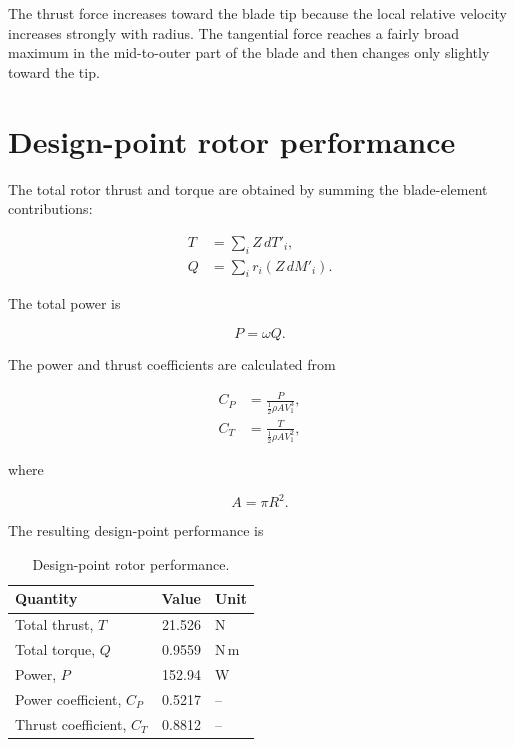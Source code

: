 \documentclass[11pt,a4paper]{article}
\begin{document}
The thrust force increases toward the blade tip because the local relative
velocity increases strongly with radius. The tangential force reaches a
fairly broad maximum in the mid-to-outer part of the blade and then changes
only slightly toward the tip.

\section{Design-point rotor performance}

The total rotor thrust and torque are obtained by summing the blade-element
contributions:

\begin{align}
T &= \sum_i Z\,dT'_i,\\
Q &= \sum_i r_i(Z\,dM'_i).
\end{align}

The total power is

\begin{equation}
P=\omega Q.
\end{equation}

The power and thrust coefficients are calculated from

\begin{align}
C_P &=
\frac{P}
{\frac{1}{2}\rho A V_1^3},\\
C_T &=
\frac{T}
{\frac{1}{2}\rho A V_1^2},
\end{align}

where

\[
A=\pi R^2.
\]

The resulting design-point performance is

\begin{table}[H]
\centering
\caption{Design-point rotor performance.}
\label{tab:performance}
\begin{tabular}{lrl}
\toprule
Quantity & Value & Unit \\
\midrule
Total thrust, $T$ & 21.526 & N \\
Total torque, $Q$ & 0.9559 & N\,m \\
Power, $P$ & 152.94 & W \\
Power coefficient, $C_P$ & 0.5217 & -- \\
Thrust coefficient, $C_T$ & 0.8812 & -- \\
\bottomrule
\end{tabular}
\end{table}
\end{document}
